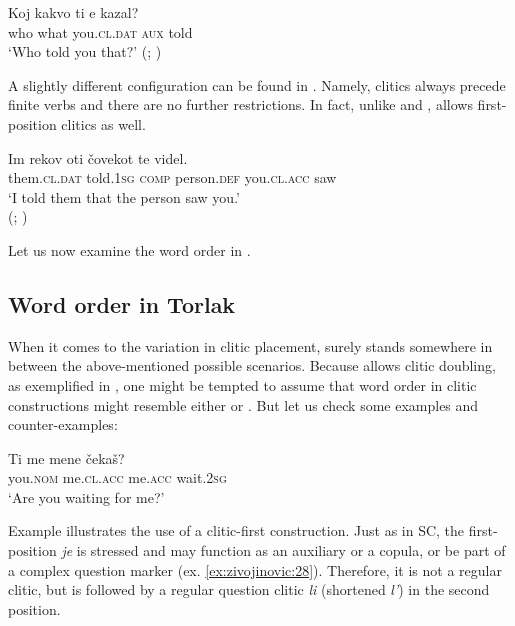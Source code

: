 \documentclass[output=paper,
colorlinks,
citecolor=brown,
newtxmath
]{langscibook}
\begin{document}
\ea\label{ex:zivojinovic:25}
\gll Koj kakvo ti          e    kazal?                                    \\
     who what  you.\textsc{cl.dat}  \textsc{aux}  told\\
\glt `Who told you that?'
\hfill (; \citealt[461]{rudin1988multiple})
\z

\noindent A slightly different configuration can be found in . Namely, clitics always precede finite verbs and there are no further restrictions. In fact, unlike  and ,  allows first-position clitics as well.


\ea\label{ex:zivojinovic:26}
\gll Im           rekov     oti čovekot     te         videl. \\
     them.\textsc{cl.dat}  told.\textsc{1sg}  \textsc{comp}   person.\textsc{def}  you.\textsc{cl.acc} saw\\
\glt `I told them that the person saw you.'\\
\hfill (; \citealt[236]{Franks.King2000})
\z

\noindent Let us now examine the word order in .


\subsection{Word order in Torlak}
\label{subsec:orderTorlak}

When it comes to the variation in clitic placement,  surely stands somewhere in between the above-mentioned possible scenarios. Because  allows clitic doubling, as exemplified in , one might be tempted to assume that word order in clitic constructions might resemble either  or . But let us check some examples and counter-examples:


\ea\label{ex:zivojinovic:27}
\gll Ti      me         mene    čekaš?\\
     you.\textsc{nom} me.\textsc{cl.acc}  me.\textsc{acc}  wait.\textsc{2sg} \\
\glt `Are you waiting for me?'
\z

\noindent Example  illustrates the use of a clitic-first construction. Just as in SC, the first-position \textit{je} is stressed and may function as an auxiliary or a copula, or be part of a complex question marker (ex. \ref{ex:zivojinovic:28}). Therefore, it is not a regular clitic, but is followed by a regular question clitic \textit{li} (shortened \textit{l'}) in the second position.
\end{document}
